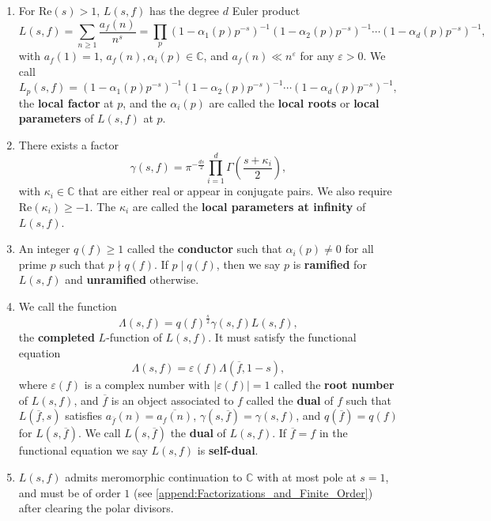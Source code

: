\documentclass[12pt]{book}
\theoremstyle{definition}\newframedtheorem{method}{Method}
\newcommand{\C}{\mathbb{C}}
\renewcommand{\a}{\alpha}
\newcommand{\g}{\gamma}
\renewcommand{\k}{\kappa}
\newcommand{\G}{\Gamma}
\renewcommand{\L}{\Lambda}
\newcommand{\e}{\varepsilon}
\newcommand{\<}{\langle}
\renewcommand{\>}{\rangle}
\newcommand{\conj}{\overline}
\renewcommand{\Re}{\mathrm{Re}}
\begin{document}
      \begin{enumerate}[label=(\roman*)]
        \item For $\Re(s) > 1$, $L(s,f)$ has the degree $d$ Euler product
        \[
          L(s,f) = \sum_{n \ge 1}\frac{a_{f}(n)}{n^{s}} = \prod_{p}(1-\a_{1}(p)p^{-s})^{-1}(1-\a_{2}(p)p^{-s})^{-1} \cdots (1-\a_{d}(p)p^{-s})^{-1},
        \]
        with $a_{f}(1) = 1$, $a_{f}(n),\a_{i}(p) \in \C$, and $a_{f}(n) \ll n^{\e}$ for any $\e > 0$. We call
        \[
          L_{p}(s,f) = (1-\a_{1}(p)p^{-s})^{-1}(1-\a_{2}(p)p^{-s})^{-1} \cdots (1-\a_{d}(p)p^{-s})^{-1},
        \]
        the \textbf{local factor} at $p$, and the $\a_{i}(p)$ are called the \textbf{local roots} or \textbf{local parameters} of $L(s,f)$ at $p$.
        \item There exists a factor
        \[
          \g(s,f) = \pi^{-\frac{ds}{2}}\prod_{i = 1}^{d}\G\left(\frac{s+\k_{i}}{2}\right),
        \]
        with $\k_{i} \in \C$ that are either real or appear in conjugate pairs. We also require $\Re(\k_{i}) \ge -1$. The $\k_{i}$ are called the \textbf{local parameters at infinity} of $L(s,f)$.
        \item An integer $q(f) \ge 1$ called the \textbf{conductor} such that $\a_{i}(p) \neq 0$ for all prime $p$ such that $p \nmid q(f)$. If $p \mid q(f)$, then we say $p$ is \textbf{ramified} for $L(s,f)$ and \textbf{unramified} otherwise.
        \item We call the function
        \[
          \L(s,f) = q(f)^{\frac{s}{2}}\g(s,f)L(s,f),
        \]
        the \textbf{completed} $L$-function of $L(s,f)$. It must satisfy the functional equation
        \[
          \L(s,f) = \e(f)\L(\conj{f},1-s),
        \]
        where $\e(f)$ is a complex number with $|\e(f)| = 1$ called the \textbf{root number} of $L(s,f)$, and $\conj{f}$ is an object associated to $f$ called the \textbf{dual} of $f$ such that $L(\conj{f},s)$ satisfies $a_{\conj{f}}(n) = \conj{a_{f}(n)}$, $\g(s,\conj{f}) = \g(s,f)$, and $q(\conj{f}) = q(f)$ for $L(s,\conj{f})$. We call $L(s,\conj{f})$ the \textbf{dual} of $L(s,f)$. If $\conj{f} = f$ in the functional equation we say $L(s,f)$ is \textbf{self-dual}.
        \item $L(s,f)$ admits meromorphic continuation to $\C$ with at most pole at $s = 1$, and must be of order $1$ (see \cref{append:Factorizations_and_Finite_Order}) after clearing the polar divisors.
      \end{enumerate}
\end{document}
